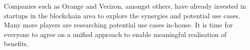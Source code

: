 \documentclass[12pt]{article}
\begin{document}
Companies such as Orange and Verizon,
amongst others, have already invested
in startups in the blockchain area to
explore the synergies and potential use
cases. Many more players are researching
potential use cases in-house. It is time for
everyone to agree on a unified approach to
enable meaningful realisation of benefits.
%
%
%
%
%
%
%
%
%
%
%
%
%
%
%
\end{document}
